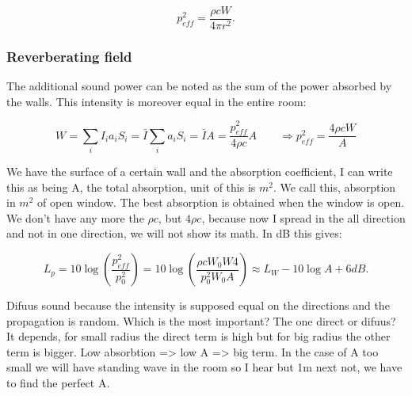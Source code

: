 	\begin{equation}
	p_{eff}^2 = \frac{\rho c W}{4 \pi r^2}.
	\end{equation}	 
	
\subsubsection{Reverberating field}
	The additional sound power can be noted as the sum of the power absorbed by the walls. This intensity is moreover equal in the entire room:
	
	\begin{equation}
	W = \sum _i I_i a_i S_i = \bar{I} \sum _i a_i S_i = \bar{I} A = \frac{p_{eff}^2}{4\rho c} A \qquad \Rightarrow p_{eff}^2 = \frac{4\rho c W}{A}
	\end{equation}	 
	
	We have the surface of a certain wall and the absorption coefficient, I can write this as being A, the total absorption, unit of this is $m^2$. We call this, absorption in $m^2$ of open window. The best absorption is obtained when the window is open. We don't have any more the $\rho c$, but $4 \rho c$, because now I spread in the all direction and not in one direction, we will not show its math. In dB this gives:
	
	\begin{equation}
	L_p = 10 \log \left( \frac{p^2_{eff}}{p^2_0} \right) = 10 \log \left( \frac{\rho c W_0W4}{p_0^2W_0A} \right) \approx L_W - 10 \log A +6dB.
	\end{equation}

	Difuus sound because the intensity is supposed equal on the directions and the propagation is random. Which is the most important? The one direct or difuus? It depends, for small radius the direct term is high but for big radius the other term is bigger. Low absorbtion => low A => big term. In the case of A too small we will have standing wave in the room so I hear but 1m next not, we have to find the perfect A.